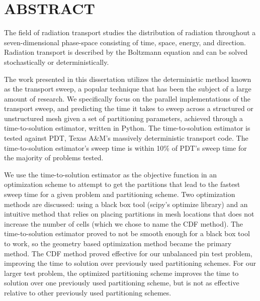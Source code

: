 %
%
%
%

\chapter*{ABSTRACT}

\pagestyle{plain} %
\setcounter{page}{2}

\indent The field of radiation transport studies the distribution of radiation throughout a seven-dimensional phase-space consisting of time, space, energy, and direction. Radiation transport is described by the Boltzmann equation and can be solved stochastically or deterministically.

The work presented in this dissertation utilizes the deterministic method known as the transport sweep, a popular technique that has been the subject of a large amount of research.
We specifically focus on the parallel implementations of the transport sweep, and predicting the time it takes to sweep across a structured or unstructured mesh given a set of partitioning parameters, achieved through a time-to-solution estimator, written in Python.
The time-to-solution estimator is tested against PDT, Texas A\&M's massively deterministic transport code.
The time-to-solution estimator's sweep time is within 10\% of PDT's sweep time for the majority of problems tested.

We use the time-to-solution estimator as the objective function in an optimization scheme to attempt to get the partitions that lead to the fastest sweep time for a given problem and partitioning scheme.
Two optimization methods are discussed: using a black box tool (scipy's optimize library) and an intuitive method that relies on placing partitions in mesh locations that does not increase the number of cells (which we chose to name the CDF method).
The time-to-solution estimator proved to not be smooth enough for a black box tool to work, so the geometry based optimization method became the primary method.
The CDF method proved effective for our unbalanced pin test problem, improving the time to solution over previously used partitioning schemes.
For our larger test problem, the optimized partitioning scheme improves the time to solution over one previously used partitioning scheme, but is not as effective relative to other previously used partitioning schemes.
\pagebreak{}
